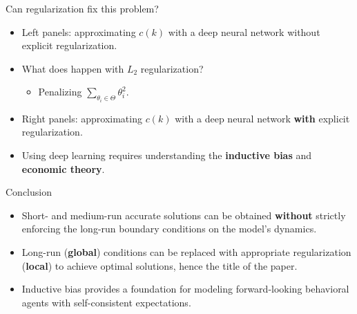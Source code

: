 \documentclass[aspectratio=169,10pt]{beamer}
\newcommand{\emphcolor}[1]{\textbf{\textcolor{emphcolorval}{#1}}}
\begin{document}
\begin{frame}{Can regularization fix this problem?}
	\begin{minipage}[t]{0.4\textwidth}
	\end{minipage}
	\hfill%
	\begin{minipage}[t]{0.5\textwidth}\raggedleft
		\begin{itemize}
			\item Left panels: approximating $c(k)$ with a deep neural network without explicit regularization.			\smallskip
			\item What does happen with $L_2$ regularization?
			\smallskip
			\begin{itemize}
				\item Penalizing $\sum_{\theta_i \in \Theta} \theta_i^2$.
			\end{itemize}
			\item Right panels: approximating $c(k)$ with a deep neural network \emphcolor{with} explicit regularization.\smallskip
			\item Using deep learning requires understanding the \emphcolor{inductive bias} and \emphcolor{economic theory}.
		\end{itemize}
	\end{minipage}
\end{frame}






\begin{frame}{Conclusion}
	\begin{itemize}
		\item Short- and medium-run accurate solutions can be obtained \emphcolor{without} strictly enforcing the long-run boundary  conditions on the model’s dynamics.
		\vspace{0.1in}
		\item Long-run (\emphcolor{global}) conditions can be replaced with appropriate regularization (\emphcolor{local}) to achieve optimal solutions, hence the title of the paper.
		\vspace{0.1in}
		\item Inductive bias provides a foundation for modeling forward-looking behavioral agents with self-consistent expectations.
	\end{itemize}
\end{frame}
\end{document}
